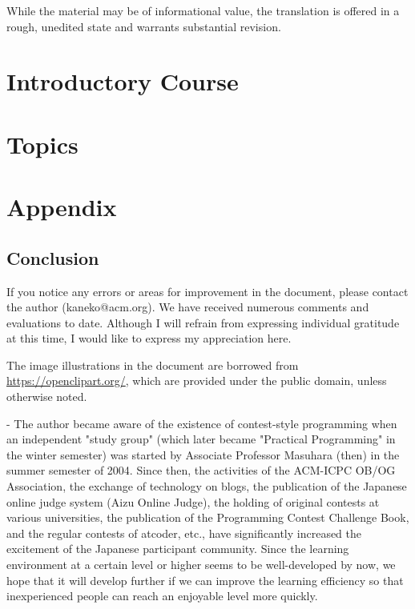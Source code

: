 \documentclass[report]{book}
\begin{document}
While the material may be of informational value, the translation is offered in a rough, unedited state and warrants substantial revision.


\tableofcontents



\part{Introductory Course}



\part{Topics}



\part{Appendix}

\begin{versionoutside}
\chapter{Conclusion}
If you notice any errors or areas for improvement in the document, please contact the author (kaneko@acm.org). We have received numerous comments and evaluations to date. Although I will refrain from expressing individual gratitude at this time, I would like to express my appreciation here.

The image illustrations in the document are borrowed from \url{https://openclipart.org/}, which are provided under the public domain, unless otherwise noted.

\vfill

\begin{itembox}[r]{-}
The author became aware of the existence of contest-style programming when an independent "study group" (which later became "Practical Programming" in the winter semester) was started by Associate Professor Masuhara (then) in the summer semester of 2004. Since then, the activities of the ACM-ICPC OB/OG Association, the exchange of technology on blogs, the publication of the Japanese online judge system (Aizu Online Judge), the holding of original contests at various universities, the publication of the Programming Contest Challenge Book, and the regular contests of atcoder, etc., have significantly increased the excitement of the Japanese participant community. Since the learning environment at a certain level or higher seems to be well-developed by now, we hope that it will develop further if we can improve the learning efficiency so that inexperienced people can reach an enjoyable level more quickly.
\end{itembox}
\end{versionoutside}
\end{document}
